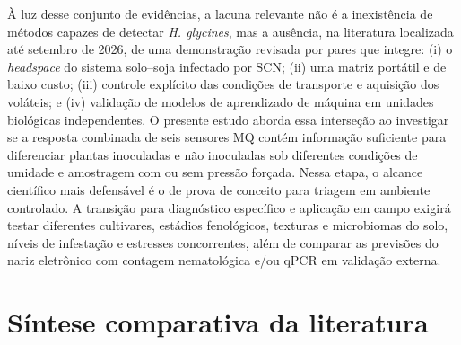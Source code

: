 \documentclass[12pt,a4paper]{article}
\begin{document}
À luz desse conjunto de evidências, a lacuna relevante não é a inexistência de métodos capazes de detectar \textit{H. glycines}, mas a ausência, na literatura localizada até setembro de 2026, de uma demonstração revisada por pares que integre: (i) o \textit{headspace} do sistema solo--soja infectado por SCN; (ii) uma matriz portátil e de baixo custo; (iii) controle explícito das condições de transporte e aquisição dos voláteis; e (iv) validação de modelos de aprendizado de máquina em unidades biológicas independentes. O presente estudo aborda essa interseção ao investigar se a resposta combinada de seis sensores MQ contém informação suficiente para diferenciar plantas inoculadas e não inoculadas sob diferentes condições de umidade e amostragem com ou sem pressão forçada. Nessa etapa, o alcance científico mais defensável é o de prova de conceito para triagem em ambiente controlado. A transição para diagnóstico específico e aplicação em campo exigirá testar diferentes cultivares, estádios fenológicos, texturas e microbiomas do solo, níveis de infestação e estresses concorrentes, além de comparar as previsões do nariz eletrônico com contagem nematológica e/ou qPCR em validação externa.

\section{Síntese comparativa da literatura}
\end{document}
